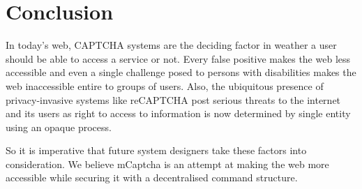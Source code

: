 \section{Conclusion}

In today's web, CAPTCHA systems are the deciding factor in weather a user should
be able to access a service or not. Every false positive makes the web less
accessible and even a single challenge posed to persons with disabilities makes
the web inaccessible entire to groups of users. Also, the
ubiquitous presence of privacy-invasive systems like reCAPTCHA post serious
threats to the internet and its users as right to access to information is
now determined by single entity using an opaque process.

So it is imperative that future system designers take these factors into
consideration. We believe mCaptcha is an attempt at making the web more
accessible while securing it with a decentralised command structure.
